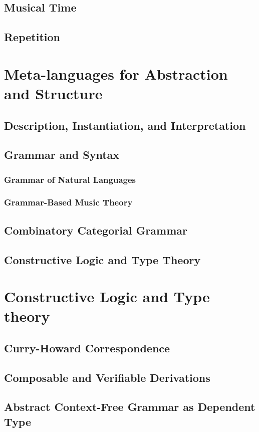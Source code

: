     \section{Musical Time}
    \section{Repetition}

\chapter{Meta-languages for Abstraction and Structure}
    \section{Description, Instantiation, and Interpretation} 
    \section{Grammar and Syntax}
        \subsection{Grammar of Natural Languages}
        \subsection{Grammar-Based Music Theory}
    \section{Combinatory Categorial Grammar}
    \section{Constructive Logic and Type Theory}
     

\chapter{Constructive Logic and Type theory}
    \section{Curry-Howard Correspondence}
    \section{Composable and Verifiable Derivations}
    \section{Abstract Context-Free Grammar as Dependent Type}
